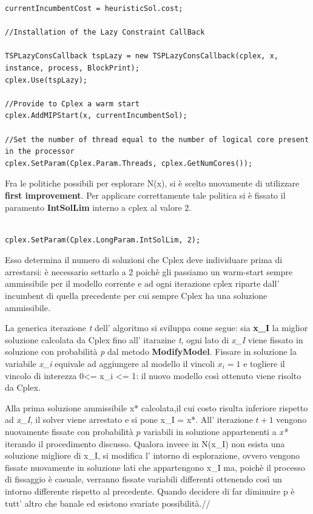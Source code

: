 \documentclass[11pt]{article}
\begin{document}
\begin{lstlisting}
currentIncumbentCost = heuristicSol.cost;

//Installation of the Lazy Constraint CallBack
            
TSPLazyConsCallback tspLazy = new TSPLazyConsCallback(cplex, x, instance, process, BlockPrint);
cplex.Use(tspLazy);
           
//Provide to Cplex a warm start
cplex.AddMIPStart(x, currentIncumbentSol);

//Set the number of thread equal to the number of logical core present in the processor
cplex.SetParam(Cplex.Param.Threads, cplex.GetNumCores());
\end{lstlisting}


Fra le politiche possibili per esplorare N(x), si è scelto nuovamente di utilizzare \textbf{first improvement}. Per applicare correttamente tale politica si è fissato il paramento \textbf{IntSolLim} interno a cplex al valore 2.

\begin{lstlisting}

cplex.SetParam(Cplex.LongParam.IntSolLim, 2);

\end{lstlisting}

Esso determina il numero di soluzioni che Cplex deve individuare prima di arrestarsi: è necessario settarlo a 2 poichè gli passiamo un warm-start sempre ammissibile per il modello corrente e ad ogni iterazione cplex riparte dall' incumbent di quella precedente per cui sempre Cplex ha una soluzione ammissibile.


La generica iterazione \textit{t} dell' algoritmo si sviluppa come segue: sia \textbf{x_I} la miglior soluzione calcolata da Cplex fino all' itarazine \textit{t}, ogni lato di \textit{x_I} viene fissato in soluzione con probabilità \textit{p} dal metodo \textbf{ModifyModel}. Fissare in soluzione la variabile \textit{x_i} equivale ad aggiungere al modello il vincoli $x_i = 1$ e togliere il vincolo di interezza 0<= x_i <= 1: il nuovo modello così ottenuto viene risolto da Cplex.

Alla prima soluzione ammissibile x* calcolata,il cui costo risulta inferiore rispetto ad \textit{x_I}, il solver viene arrestato e si pone x_I = x*. All' iterazione $t + 1$ vengono nuovamente fissate con probabilità $p$ variabili in soluzione appartenenti a \textit{x*}  iterando il procedimento discusso. Qualora invece in N(x_I) non esista una soluzione migliore di x_I, si modifica l' intorno di esplorazione, ovvero vengono fissate nuovamente in soluzione lati che appartengono x_I ma, poichè il processo di fissaggio è casuale, verranno fissate variabili differenti ottenendo così un intorno differente rispetto al precedente. Quando decidere di far diminuire p è tutt' altro che banale ed esistono svariate possibilità.//
\end{document}
